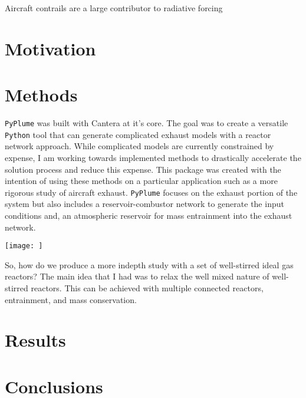 \documentclass[smallextended,referee]{svjour3}
\begin{document}
Aircraft contrails are a large contributor to radiative forcing

\section{Motivation}


\section{Methods}

\texttt{PyPlume} was built with Cantera\cite{cantera} at it's core. The goal was to create a versatile \texttt{Python} tool that can generate complicated exhaust models with a reactor network approach. While complicated models are currently constrained by expense, I am working towards implemented methods to drastically accelerate the solution process and reduce this expense. This package was created with the intention of using these methods on a particular application such as a more rigorous study of aircraft exhaust. \texttt{PyPlume} focuses on the exhaust portion of the system but also includes a reservoir-combustor network to generate the input conditions and, an atmospheric reservoir for mass entrainment into the exhaust network.

\texttt{[image: ]}

So, how do we produce a more indepth study with a set of well-stirred ideal gas reactors? The main idea that I had was to relax the well mixed nature of well-stirred reactors. This can be achieved with multiple connected reactors, entrainment, and mass conservation. 

\section{Results}

\section{Conclusions}

\begin{acknowledgements}

\end{acknowledgements}

\appendix




\end{document}
